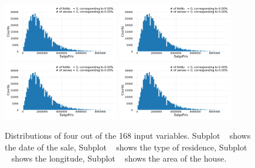 \begin{figure}
  \centering
  \subfloat[\label{fig:h:variable_overview_date}]{\qquad}
  \includegraphics[width=0.45\textwidth, page=2, trim=15 15 15 15, clip]{figures/housing/overview_fig.pdf}\hfil
  \subfloat[\label{fig:h:variable_overview_type}]{\qquad}
  \includegraphics[width=0.45\textwidth, page=6, trim=15 15 15 15, clip]{figures/housing/overview_fig.pdf}
  \subfloat[\label{fig:h:variable_overview_longitude}]{\qquad}
  \includegraphics[width=0.45\textwidth, page=20, trim=15 15 15 15, clip]{figures/housing/overview_fig.pdf}\hfil
  \subfloat[\label{fig:h:variable_overview_area}]{\qquad}
  \includegraphics[width=0.45\textwidth, page=23, trim=15 15 15 15, clip]{figures/housing/overview_fig.pdf}
  \caption[Distributions of the Variables in the Housing Prices]{Distributions of four out of the \num{168} input variables. 
           Subplot ~\protect{} shows the date of the sale, 
           Subplot ~\protect{} shows the type of residence,
           Subplot ~\protect{} shows the longitude,
           Subplot ~\protect{} shows the area of the house.}
  \label{fig:h:variable_overview}
\end{figure}

